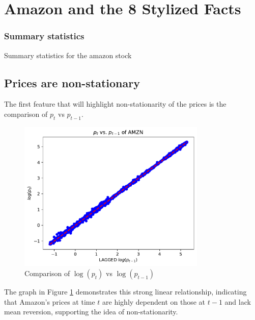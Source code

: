 \documentclass{article}
\begin{document}
\section{Amazon and the 8 Stylized Facts}

\subsubsection{Summary statistics}


\begin{table}[H]
    \centering
      
    \caption{Summary statistics for the amazon stock}
    \label{tab:Stylized_facts_preview}
\end{table}


\subsection{Prices are non-stationary}

The first feature that will highlight non-stationarity of
the prices is the comparison of \( p_t \) vs \( p_{t-1} \).

\begin{figure}[H]
    \centering
    \includegraphics[width=0.8\textwidth]{Img/Laggedlog(p_t-1).pdf}
    \caption{Comparison of \( \log(p_t) \) vs \( \log(p_{t-1}) \)}
    \label{fig:LogptVSLogpt-1}
\end{figure}

\noindent The graph in Figure \ref{fig:LogptVSLogpt-1} demonstrates this strong linear 
relationship, indicating that Amazon's prices at time \( t \) are highly dependent on those at \( t-1 \) and lack mean reversion,
 supporting the idea of non-stationarity.
\end{document}

